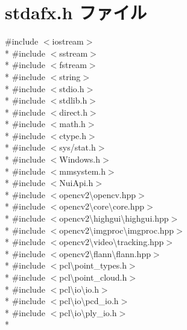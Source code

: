\section{stdafx.\-h ファイル}
\label{stdafx_8h}
{\ttfamily \#include $<$iostream$>$}\\*
{\ttfamily \#include $<$sstream$>$}\\*
{\ttfamily \#include $<$fstream$>$}\\*
{\ttfamily \#include $<$string$>$}\\*
{\ttfamily \#include $<$stdio.\-h$>$}\\*
{\ttfamily \#include $<$stdlib.\-h$>$}\\*
{\ttfamily \#include $<$direct.\-h$>$}\\*
{\ttfamily \#include $<$math.\-h$>$}\\*
{\ttfamily \#include $<$ctype.\-h$>$}\\*
{\ttfamily \#include $<$sys/stat.\-h$>$}\\*
{\ttfamily \#include $<$Windows.\-h$>$}\\*
{\ttfamily \#include $<$mmsystem.\-h$>$}\\*
{\ttfamily \#include $<$Nui\-Api.\-h$>$}\\*
{\ttfamily \#include $<$opencv2\textbackslash{}opencv.\-hpp$>$}\\*
{\ttfamily \#include $<$opencv2\textbackslash{}core\textbackslash{}core.\-hpp$>$}\\*
{\ttfamily \#include $<$opencv2\textbackslash{}highgui\textbackslash{}highgui.\-hpp$>$}\\*
{\ttfamily \#include $<$opencv2\textbackslash{}imgproc\textbackslash{}imgproc.\-hpp$>$}\\*
{\ttfamily \#include $<$opencv2\textbackslash{}video\textbackslash{}tracking.\-hpp$>$}\\*
{\ttfamily \#include $<$opencv2\textbackslash{}flann\textbackslash{}flann.\-hpp$>$}\\*
{\ttfamily \#include $<$pcl\textbackslash{}point\-\_\-types.\-h$>$}\\*
{\ttfamily \#include $<$pcl\textbackslash{}point\-\_\-cloud.\-h$>$}\\*
{\ttfamily \#include $<$pcl\textbackslash{}io\textbackslash{}io.\-h$>$}\\*
{\ttfamily \#include $<$pcl\textbackslash{}io\textbackslash{}pcd\-\_\-io.\-h$>$}\\*
{\ttfamily \#include $<$pcl\textbackslash{}io\textbackslash{}ply\-\_\-io.\-h$>$}\\*
